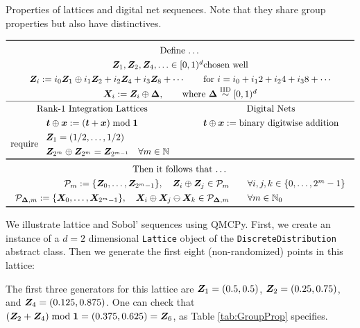 \documentclass[graybox,footinfo]{svmult}
\newcommand{\IID}{\textup{IID}}
\newcommand{\IIDsim}{\overset{\IID}{\sim}}
\begin{document}
\begin{table}
	\centering
	\caption{Properties of lattices and digital net sequences.  Note that they share group properties but also have distinctives.} \label{tab:GroupProp}
\[
	\renewcommand{\arraystretch}{1.3}
\begin{array}{c@{\qquad}c}
	\toprule
	\multicolumn{2}{c}{\text{Define \ldots}} \\
	\multicolumn{2}{c}{\bsZ_1, \bsZ_2, \bsZ_4, \ldots \in [0,1)^d \text{chosen well} } \\
	\multicolumn{2}{c}{
	\bsZ_{i} := i_0  \bsZ_1 \oplus i_1 \bsZ_{2} + i_2  \bsZ_{4} +  i_3  \bsZ_{8} + \cdots 
	\qquad
	\text{for }i = i_0 +i_1 2 + i_2 4 + i_3 8 + \cdots} \\
    \multicolumn{2}{c}{\bsX_i := \bsZ_i \oplus \bsDelta, \qquad \text{where }\bsDelta \IIDsim [0,1)^d} \\  \hline
	\text{Rank-1 Integration Lattices} & \text{Digital Nets} \\
		\bst \oplus \bsx : = (\bst + \bsx) \bmod \bsone & \bst \oplus \bsx := \text{binary digitwise addition} \\ 
		 \text{require } \begin{array}{l} \bsZ_1 = (1/2, \ldots, 1/2) \\
		 	\bsZ_{2^{m}} \oplus \bsZ_{2^{m}} = \bsZ_{2^{m-1}} \quad \forall m \in \bbN \end{array}
		\\
\toprule
\multicolumn{2}{c}{\text{Then it follows that \ldots}} \\
	\multicolumn{2}{c}{\begin{array}{r}
			\calP_m := \{\bsZ_0, \ldots, \bsZ_{2^m-1}\}, \quad
			\bsZ_i \oplus \bsZ_j \in \calP_m \\
			\calP_{\bsDelta,m} := \{\bsX_0, \ldots, \bsX_{2^m-1}\}, \quad
			\bsX_i \oplus \bsX_j \ominus \bsX_k \in \calP_{\bsDelta,m}
	\end{array} \quad \begin{array}{l}\forall  i,j,k \in \{0, \ldots, 2^{m} -1\} \\ \forall m \in \bbN_0\end{array}} \\
\bottomrule
\end{array}
\]
\end{table}

We illustrate lattice and Sobol' sequences using QMCPy. First, we create an instance of a $d=2$ dimensional \texttt{Lattice} object of the  \texttt{DiscreteDistribution} abstract class.  Then we generate the first eight (non-randomized) points in this lattice:

The first three generators for this lattice are ${\boldsymbol{Z}}_1 = (0.5, 0.5)$, ${\boldsymbol{Z}}_2 = (0.25, 0.75)$, and ${\boldsymbol{Z}}_4 = (0.125, 0.875)$.  One can check that $({\boldsymbol{Z}}_2 + {\boldsymbol{Z}}_4) \bmod {\boldsymbol{1}} = (0.375, 0.625) = {\boldsymbol{Z}}_6$, as Table \ref{tab:GroupProp} specifies.
\end{document}
